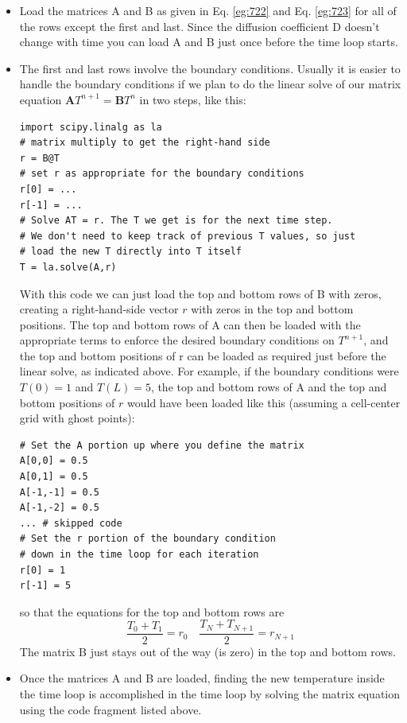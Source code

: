 \documentclass{book}
\theoremstyle{plain}
\theoremstyle{definition}
\numberwithin{exm}{chapter}
\theoremstyle{remark}
\theoremstyle{summary}
\theoremstyle{overview}
\begin{document}
\begin{itemize}
\item Load the matrices A and B as given in Eq. \eqref{eg:722} and Eq. \eqref{eg:723} for all of
the rows except the first and last. Since the diffusion coefficient D doesn\rq t
change with time you can load A and B just once before the time loop starts.
\item The first and last rows involve the boundary conditions. Usually it is easier
to handle the boundary conditions if we plan to do the linear solve of our matrix equation $\mathbf{A} T^{n+1}=\mathbf{B} T^{n}$ in two steps, like this:
\begin{lstlisting}
import scipy.linalg as la
# matrix multiply to get the right-hand side
r = B@T
# set r as appropriate for the boundary conditions
r[0] = ...
r[-1] = ...
# Solve AT = r. The T we get is for the next time step.
# We don't need to keep track of previous T values, so just
# load the new T directly into T itself
T = la.solve(A,r)
\end{lstlisting}
With this code we can just load the top and bottom rows of B with zeros, creating a right-hand-side vector $r$ with zeros in the top and bottom positions.
The top and bottom rows of A can then be loaded with the appropriate
terms to enforce the desired boundary conditions on $T^{n+1}$, and the top and
bottom positions of r can be loaded as required just before the linear solve,
as indicated above. For example, if the boundary conditions were $T (0) = 1$ and $T (L) = 5$, the top
and bottom rows of A and the top and bottom positions of $r$ would have
been loaded like this (assuming a cell-center grid with ghost points):
\begin{lstlisting}
# Set the A portion up where you define the matrix
A[0,0] = 0.5
A[0,1] = 0.5
A[-1,-1] = 0.5
A[-1,-2] = 0.5
... # skipped code
# Set the r portion of the boundary condition
# down in the time loop for each iteration
r[0] = 1
r[-1] = 5
\end{lstlisting}
so that the equations for the top and bottom rows are
\begin{equation}\label{eq:725}
\frac{T_{0}+T_{1}}{2}=r_{0} \quad \frac{T_{N}+T_{N+1}}{2}=r_{N+1}
\end{equation}
The matrix B just stays out of the way (is zero) in the top and bottom rows.
\item  Once the matrices A and B are loaded, finding the new temperature inside the time loop is accomplished in the time loop by solving the matrix
equation using the code fragment listed above.
\end{itemize}
\end{document}
